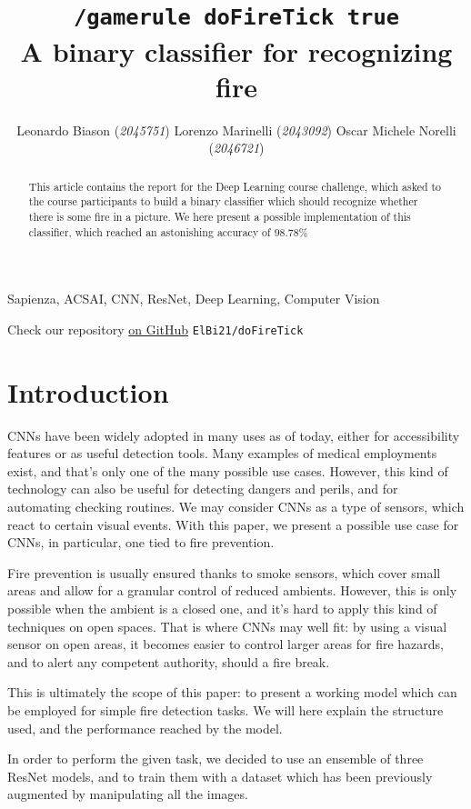 \documentclass[11pt, journal]{IEEEtran}
\title{\texttt{/gamerule doFireTick true}\\A binary classifier for recognizing fire}
\author{Leonardo Biason (\textit{2045751}) \quad Lorenzo Marinelli (\textit{2043092}) \quad Oscar Michele Norelli (\textit{2046721})}
\newcommand{\nl}{

\medskip

}
\begin{document}
\maketitle

\begin{abstract}
    This article contains the report for the Deep Learning course challenge, which asked to the course participants to build a binary classifier which should recognize whether there is some fire in a picture. We here present a possible implementation of this classifier, which reached an astonishing accuracy of $\mathbf{98.78\%}$
\end{abstract}

\begin{keywords}
    Sapienza, ACSAI, CNN, ResNet, Deep Learning, Computer Vision 
\end{keywords}

\begin{tcolorbox}[colback = Purple!20, colframe = Purple!40]
    \begin{center}
         Check our repository \href{https://www.github.com/ElBi21/doFireTick}{on GitHub}
        \verb|ElBi21/doFireTick|
    \end{center}
\end{tcolorbox}

\section{Introduction}

CNNs have been widely adopted in many uses as of today, either for accessibility features or as useful detection tools. Many examples of medical employments exist, and that's only one of the many possible use cases. However, this kind of technology can also be useful for detecting dangers and perils, and for automating checking routines. We may consider CNNs as a type of sensors, which react to certain visual events. With this paper, we present a possible use case for CNNs, in particular, one tied to fire prevention.
\nl
\indent Fire prevention is usually ensured thanks to smoke sensors, which cover small areas and allow for a granular control of reduced ambients. However, this is only possible when the ambient is a closed one, and it's hard to apply this kind of techniques on open spaces. That is where CNNs may well fit: by using a visual sensor on open areas, it becomes easier to control larger areas for fire hazards, and to alert any competent authority, should a fire break.
\nl
\indent This is ultimately the scope of this paper: to present a working model which can be employed for simple fire detection tasks. We will here explain the structure used, and the performance reached by the model.
\nl
In order to perform the given task, we decided to use an ensemble of three ResNet \cite{7780459} models, and to train them with a dataset which has been previously augmented by manipulating all the images.
\end{document}

